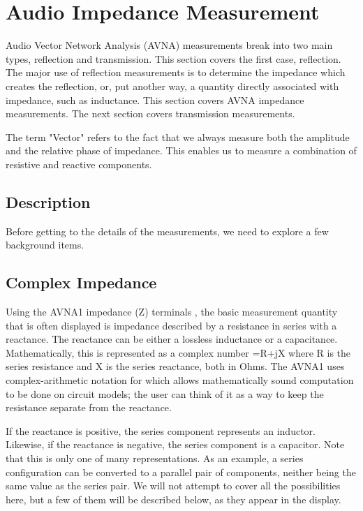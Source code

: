 \section{Audio Impedance Measurement}
\label{sect:ZMeas}
%
Audio Vector Network Analysis (AVNA) measurements break into two main types,  reflection and transmission.  This section covers the first case, reflection.  The major use of reflection measurements is to determine the impedance
which creates the reflection, or, put another way, a quantity directly associated with impedance, such as inductance. This section covers AVNA impedance measurements. The next section covers transmission measurements.

The term "Vector" refers to the fact that we always measure both the amplitude and the relative phase of impedance.  This enables us to measure a combination of resistive and reactive components.
%
\subsection{Description}
\label{subsect:ZDescr}
Before getting to the details of the measurements, we need to explore a few background items.

\subsection{Complex Impedance}Using the AVNA1 impedance (Z) terminals , the basic measurement quantity that is often displayed is impedance described by a resistance in series with a reactance. The reactance can be either a lossless inductance or a capacitance. Mathematically, this is represented as a complex number =R+jX where R is the series resistance and X is the series reactance, both in Ohms. The AVNA1 uses complex-arithmetic notation for  which allows mathematically sound computation to be done on circuit models; the user can think of it as a way to keep the resistance separate from the reactance.

If the reactance is positive, the series component represents an inductor. Likewise, if the reactance is negative, the series component is a capacitor.  Note that this is only one of many representations. As an example, a series configuration can be converted to a parallel pair of components, neither being the same value as the series pair.  We will not attempt to cover all the possibilities here, but a few of them will be described below, as they appear in the display.

